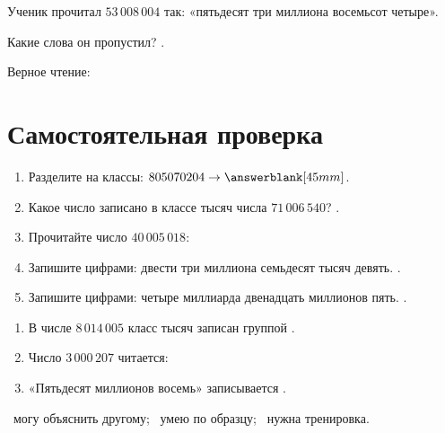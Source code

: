 \begin{warningbox}[Ошибка 2]
  Ученик прочитал \(53\,008\,004\) так:
  «пятьдесят три миллиона восемьсот четыре».

  Какие слова он пропустил? \answerblank[55mm].

  Верное чтение:
\end{warningbox}

\section{Самостоятельная проверка}

\begin{practicebox}
  \begin{enumerate}[label=\textbf{\arabic*.},itemsep=0.4em]
    \item Разделите на классы: \(805070204\rightarrow\answerblank[45mm]\).
    \item Какое число записано в классе тысяч числа \(71\,006\,540\)?
      \answerblank[18mm].
    \item Прочитайте число \(40\,005\,018\):
    \item Запишите цифрами: двести три миллиона семьдесят тысяч девять.
      \answerblank[42mm].
    \item Запишите цифрами: четыре миллиарда двенадцать миллионов пять.
      \answerblank[45mm].
  \end{enumerate}
\end{practicebox}

\begin{checkpointbox}
  \begin{enumerate}
    \item В числе \(8\,014\,005\) класс тысяч записан группой \answerblank[18mm].
    \item Число \(3\,000\,207\) читается:
    \item «Пятьдесят миллионов восемь» записывается \answerblank[35mm].
  \end{enumerate}
\end{checkpointbox}

\begin{reflectionbox}
  \choicebox\ могу объяснить другому;
  \qquad
  \choicebox\ умею по образцу;
  \qquad
  \choicebox\ нужна тренировка.
\end{reflectionbox}
